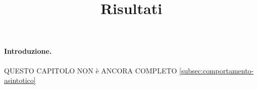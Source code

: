 \title{Risultati}
\maketitle
\label{sec:results}

\paragraph{Introduzione.}

QUESTO CAPITOLO NON è ANCORA COMPLETO
\autoref{subsec:comportamento-asintotico}


\relax


